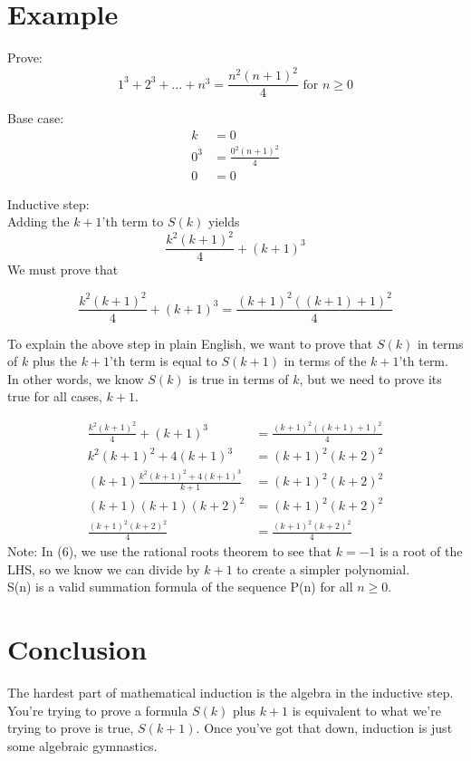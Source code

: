 \documentclass{article}
\begin{document}
\newpage
\section{Example}
Prove:
\[1^{3} + 2^{3} + \dots + n^{3} = \frac{n^{2}(n+1)^{2}}{4} \text{ for }  n \geq 0
\]

\noindent
Base case:
\begin{align}
k &= 0 \\
0^{3} &= \frac{0^{2}(n+1)^{2}}{4} \\
0 &= 0
\end{align}

\noindent
Inductive step: \\

\noindent
Adding the $k+1$'th term to $S(k)$ yields
\[
\frac{k^{2}(k+1)^{2}}{4} + (k+1)^{3}
\]
We must prove that 

\[
\frac{k^{2}(k+1)^{2}}{4} + (k+1)^{3} = \frac{(k+1)^{2}((k+1)+1)^{2}}{4} 
\]

\noindent
To explain the above step in plain English, we want to prove that $S(k)$ in terms of $k$ plus the $k+1$'th term is equal to $S(k+1)$ in terms of the $k+1$'th term. \\

\noindent
In other words, we know $S(k)$ is true in terms of $k$, but we need to prove its true for all cases, $k+1$.

\begin{align}
\frac{k^{2}(k+1)^{2}}{4} + (k+1)^{3} &= \frac{(k+1)^{2}((k+1)+1)^{2}}{4} \\[10pt]
k^{2}(k+1)^{2}+4(k+1)^{3} &= (k+1)^{2}(k+2)^{2} \\[10pt]
(k+1)\frac{k^{2}(k+1)^{2}+4(k+1)^{3}}{k+1} &= (k+1)^{2}(k+2)^{2} \\[10pt]
(k+1)(k+1)(k+2)^{2} &= (k+1)^{2}(k+2)^{2} \\[10pt]
\frac{(k+1)^{2}(k+2)^{2}}{4} &= \frac{(k+1)^{2}(k+2)^{2}}{4} 
\end{align}
\noindent
Note: In (6), we use the rational roots theorem to see that $k = -1$ is a root of the LHS, so we know we can divide by $k+1$ to create a simpler polynomial. \\

\noindent
S(n) is a valid summation formula  of the sequence P(n) for all $n\geq0$.

\section{Conclusion}
\noindent
The hardest part of mathematical induction is the algebra in the inductive step. You're trying to prove a formula $S(k)$ plus $k+1$ is equivalent to what we're trying to prove is true, $S(k+1)$. Once you've got that down, induction is just some algebraic gymnastics. \\
\end{document}
